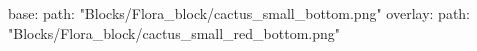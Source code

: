 base:
  path: "Blocks/Flora_block/cactus_small_bottom.png"
overlay:
  path: "Blocks/Flora_block/cactus_small_red_bottom.png"